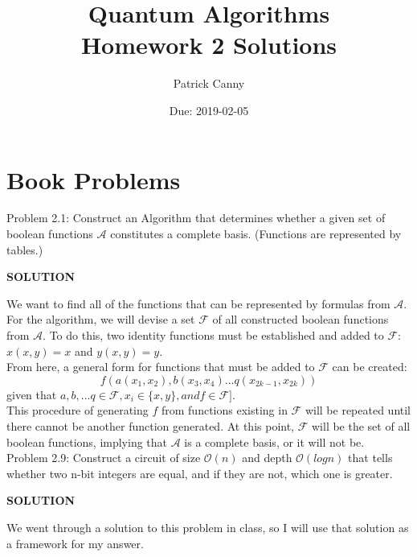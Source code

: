 \documentclass{exam} %
\newcommand{\cl}[1]{\mathcal{#1}}  %
\theoremstyle{plain}
\theoremstyle{definition}
\theoremstyle{remark}
\numberwithin{equation}{section}  %
\newcommand{\sol}{\begin{center}\textbf{SOLUTION}\end{center}}
\begin{document}
\title{Quantum Algorithms \\ Homework 2 Solutions}
\author{Patrick Canny}
\date{Due: 2019-02-05}
\maketitle
\section{Book Problems}
\begin{questions}
  \question Problem 2.1: Construct an Algorithm that determines whether a given set
  of boolean functions $\cl{A}$ constitutes a complete basis. (Functions are 
  represented by tables.)\\
  \sol
  We want to find all of the functions that can be represented by formulas from 
  $\cl{A}$. For the algorithm, we will devise a set $\cl{F}$ of all constructed
  boolean functions from $\cl{A}$. To do this, two identity functions must be 
  established and added to $\cl{F}$: $x(x, y) = x$ and $y(x, y) = y$.\\ 
  
  From here, a general form for functions that must be added to $\cl{F}$ can be
  created: 
  \[
    f(a(x_1, x_2), b(x_3, x_4)...q(x_{2k-1}, x_{2k}))
  \]
  given that $a, b,...q \in \cl{F}, x_i \in \{x, y\}, and f \in \cl{F]}$.\\
  
  This procedure of generating $f$ from functions existing in $\cl{F}$ will be
  repeated until there cannot be another function generated. At this point, 
  $\cl{F}$ will be the set of all boolean functions, implying that $\cl{A}$ is
  a complete basis, or it will not be.\\
  \question Problem 2.9: Construct a circuit  of size $\cl{O}(n)$ and depth 
  $\cl{O}(log n)$
  that tells whether two n-bit integers are equal, and if they are not, which one is
  greater.\\
  \sol
  We went through a solution to this problem in class, so I will use that solution
  as a framework for my answer.\\


\end{questions}
\end{document}
